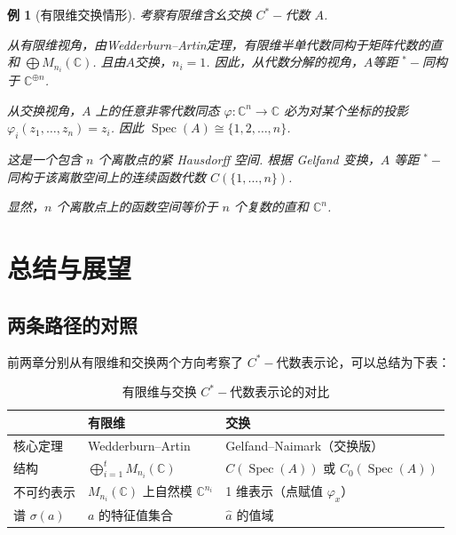 \documentclass[math-font=lm, text-font=lm, math-style=TeX]{sjtureport}
\newtheorem{example}{例}[chapter]
\theoremstyle{plain}
\theoremstyle{plain}
\renewcommand{\arraystretch}{1}
\DeclareMathOperator{\Spec}{Spec}
\begin{document}
\begin{example}[有限维交换情形]
    考察有限维含幺交换 $C^*-\!$代数 $A$.\par
    从有限维视角，由Wedderburn--Artin定理，有限维半单代数同构于矩阵代数的直和 $\bigoplus M_{n_i}(\mathbb{C})$. 且由$A$交换，$n_i = 1$. 因此，从代数分解的视角，$A$等距 ${}^*-\!$同构于 $\mathbb{C}^{\oplus n}$. \par
    从交换视角，$A$ 上的任意非零代数同态 $\varphi: \mathbb{C}^n \to \mathbb{C}$ 必为对某个坐标的投影 $\varphi_i(z_1, \dots, z_n) = z_i$. 因此 $\Spec(A) \cong \{1, 2, \dots, n\}$. \par
    这是一个包含 $n$ 个离散点的紧 Hausdorff 空间. 根据 Gelfand 变换，$A$ 等距 ${}^*-\!$同构于该离散空间上的连续函数代数 $C(\{1, \dots, n\})$.\par
    显然，$n$ 个离散点上的函数空间等价于 $n$ 个复数的直和 $\mathbb{C}^n$.\par
\end{example}



\chapter{总结与展望}

\section{两条路径的对照}

前两章分别从有限维和交换两个方向考察了 $C^*-\!$代数表示论，可以总结为下表：

\begin{table}[H]
    \centering
    \renewcommand{\arraystretch}{1.35}
    \caption{有限维与交换 $C^*-\!$代数表示论的对比}
    \label{tab:comparison}
    \begin{tabular}{p{3cm}|p{4cm}|p{4cm}}
        \hline
        & \textbf{有限维} & \textbf{交换} \\
        \hline
        核心定理 & Wedderburn--Artin & Gelfand--Naimark（交换版） \\
        \hline
        结构 & $\displaystyle\bigoplus_{i=1}^t M_{n_i}(\mathbb{C})$ & $C(\Spec(A))$ 或 $C_0(\Spec(A))$ \\
        \hline
        不可约表示 & $M_{n_i}(\mathbb{C})$ 上自然模 $\mathbb{C}^{n_i}$ & 1 维表示（点赋值 $\varphi_x$） \\
        \hline
        谱 $\sigma(a)$ & $a$ 的特征值集合 & $\widehat{a}$ 的值域 \\
        \hline
    \end{tabular}
\end{table}
\end{document}
